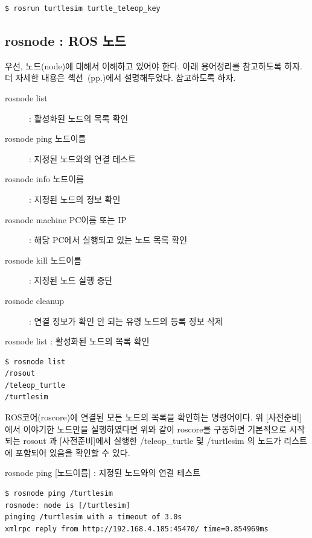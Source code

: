 \begin{lstlisting}[language=ROS]
$ rosrun turtlesim turtle_teleop_key
\end{lstlisting}

\newpage
\subsection{rosnode : ROS 노드}

우선, 노드(node)에 대해서 이해하고 있어야 한다. 아래 용어정리를 참고하도록 하자. 더 자세한 내용은 섹션~(pp.\pageref{def:RosNode})에서 설명해두었다. 참고하도록 하자.

\vspace{\baselineskip}
\noindent
\begin{description}
\item[rosnode list] : 활성화된 노드의 목록 확인
\item[rosnode ping 노드이름] : 지정된 노드와의 연결 테스트
\item[rosnode info 노드이름] : 지정된 노드의 정보 확인
\item[rosnode machine PC이름 또는 IP] : 해당 PC에서 실행되고 있는 노드 목록 확인
\item[rosnode kill 노드이름] : 지정된 노드 실행 중단
\item[rosnode cleanup] : 연결 정보가 확인 안 되는 유령 노드의 등록 정보 삭제
\end{description}

\setcounter{num}{0}

\vspace{\baselineskip}
\noindent
{}\circled{\thenum} rosnode list : 활성화된 노드의 목록 확인
\begin{lstlisting}[language=ROS]
$ rosnode list
/rosout
/teleop_turtle
/turtlesim
\end{lstlisting}

\noindent
ROS코어(roscore)에 연결된 모든 노드의 목록을 확인하는 명령어이다. 위 [사전준비] 에서 이야기한 노드만을 실행하였다면 위와 같이 roscore를 구동하면 기본적으로 시작되는 rosout 과 [사전준비]에서 실행한 /teleop\_turtle 및 /turtlesim 의 노드가 리스트에 포함되어 있음을 확인할 수 있다.

\vspace{\baselineskip}
\noindent
{}\circled{\thenum} rosnode ping [노드이름] : 지정된 노드와의 연결 테스트
\begin{lstlisting}[language=ROS]
$ rosnode ping /turtlesim
rosnode: node is [/turtlesim]
pinging /turtlesim with a timeout of 3.0s
xmlrpc reply from http://192.168.4.185:45470/ time=0.854969ms
\end{lstlisting}

